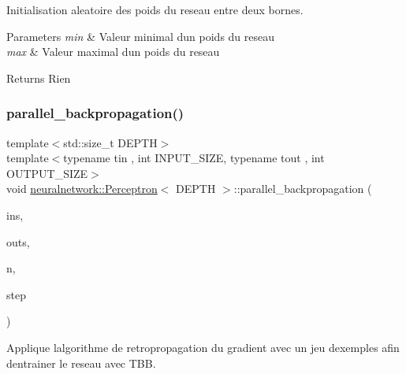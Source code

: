 Initialisation aleatoire des poids du reseau entre deux bornes. 


\begin{DoxyParams}{Parameters}
{\em min} & Valeur minimal d\textquotesingle{}un poids du reseau \\
\hline
{\em max} & Valeur maximal d\textquotesingle{}un poids du reseau \\
\hline
\end{DoxyParams}
\begin{DoxyReturn}{Returns}
Rien 
\end{DoxyReturn}
\mbox{\label{classneuralnetwork_1_1_perceptron_a0f2a106043e5febb19e0d18a94e32dcc}} 
\subsubsection{\texorpdfstring{parallel\+\_\+backpropagation()}{parallel\_backpropagation()}}
{\footnotesize\ttfamily template$<$std\+::size\+\_\+t D\+E\+P\+TH$>$ \\
template$<$typename tin , int I\+N\+P\+U\+T\+\_\+\+S\+I\+ZE, typename tout , int O\+U\+T\+P\+U\+T\+\_\+\+S\+I\+ZE$>$ \\
void \mbox{\hyperlink{classneuralnetwork_1_1_perceptron}{neuralnetwork\+::\+Perceptron}}$<$ D\+E\+P\+TH $>$\+::parallel\+\_\+backpropagation (\begin{DoxyParamCaption}\item[{\mbox{\hyperlink{_perceptron_8hpp_a1df3992453d71de615dab4ca5eadba8d}{neuralnetwork\+::\+In\+Out}}$<$ tin, I\+N\+P\+U\+T\+\_\+\+S\+I\+ZE $>$ $\ast$}]{ins,  }\item[{\mbox{\hyperlink{_perceptron_8hpp_a1df3992453d71de615dab4ca5eadba8d}{neuralnetwork\+::\+In\+Out}}$<$ tout, O\+U\+T\+P\+U\+T\+\_\+\+S\+I\+ZE $>$ $\ast$}]{outs,  }\item[{std\+::size\+\_\+t}]{n,  }\item[{double}]{step }\end{DoxyParamCaption})}



Applique l\textquotesingle{}algorithme de retropropagation du gradient avec un jeu d\textquotesingle{}exemples afin d\textquotesingle{}entrainer le reseau avec T\+BB. 


